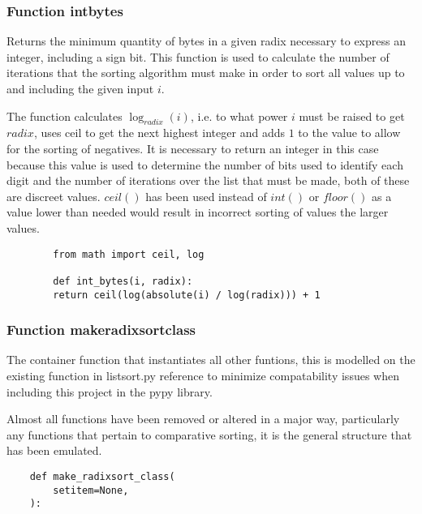 \documentclass[12pt]{article}
\begin{document}
\subsubsection{Function int\textunderscore bytes}
\label{ssec:intbytes}
Returns the minimum quantity of bytes in a given radix necessary to express an integer, including a sign bit. This function is used to calculate the number of iterations that the sorting algorithm must make in order to sort all values up to and including the given input $i$.
\par
The function calculates  $ \log_{radix}(i)$, i.e. to what power $i$ must be raised to get $radix$, uses ceil to get the next highest integer and adds $1$ to the value to allow for the sorting of negatives. It is necessary to return an integer in this case because this value is used to determine the number of bits used to identify each digit and the number of iterations over the list that must be made, both of these are discreet values. $ceil()$ has been used instead of $int()$ or $floor()$ as a value lower than needed would result in incorrect sorting of values the larger values.
\par
\begin{lstlisting}
        from math import ceil, log
        
        def int_bytes(i, radix):
        return ceil(log(absolute(i) / log(radix))) + 1
      \end{lstlisting}
\pagebreak
\subsubsection{Function make\textunderscore radixsort\textunderscore class}
The container function that instantiates all other funtions, this is modelled on the existing function in listsort.py {\color{red}reference} to minimize compatability issues when including this project in the pypy library.
\par
Almost all functions have been removed or altered in a major way, particularly any functions that pertain to comparative sorting, it is the general structure that has been emulated.
\begin{lstlisting}
    def make_radixsort_class(
        setitem=None,
    ):
  \end{lstlisting}
\end{document}
